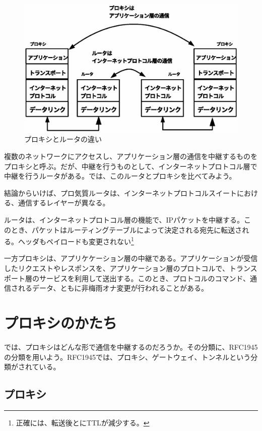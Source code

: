 \begin{figure}[htbp]
	\includegraphics[width=12cm,clip]{draw/fig2.eps}
	\caption{プロキシとルータの違い}
	\label{fig:proxy and router}
\end{figure}

複数のネットワークにアクセスし、アプリケーション層の通信を中継するものをプロキシと呼ぶ。だが、中継を行うものとして、インターネットプロトコル層で中継を行うルータがある。では、このルータとプロキシを比べてみよう。

結論からいけば、プロ気質ルータは、インターネットプロトコルスイートにおける、通信するレイヤーが異なる。

ルータは、インターネットプロトコル層の機能で、IPパケットを中継する。このとき、パケットはルーティングテーブルによって決定される宛先に転送される。ヘッダもペイロードも変更されない\footnote{正確には、転送後とにTTLが減少する。}

一方プロキシは、アプリケケーション層の中継である。アプリケーションが受信したリクエストやレスポンスを、アプリケーション層のプロトコルで、トランスポート層のサービスを利用して送出する。このとき、プロトコルのコマンド、通信されるデータ、ともに非梅雨オナ変更が行われることがある。

\section{プロキシのかたち}
では、プロキシはどんな形で通信を中継するのだろうか。その分類に、RFC1945の分類を用いよう。RFC1945では、プロキシ、ゲートウェイ、トンネルという分類がされている。

\subsection{プロキシ}

